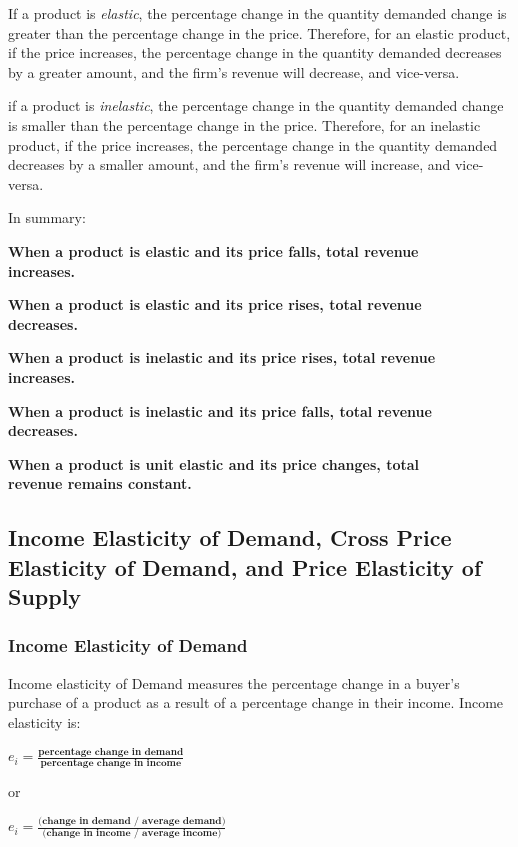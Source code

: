 \documentclass[a4paper, 12pt] {article}
\begin{document}
If a product is \emph{elastic}, the percentage change in the quantity demanded
change is greater than the percentage change in the price. Therefore, for an
elastic product, if the price increases, the percentage change in the quantity
demanded decreases by a greater amount, and the firm's revenue will decrease,
and vice-versa.

if a product is \emph{inelastic}, the percentage change in the quantity demanded
change is smaller than the percentage change in the price. Therefore, for an 
inelastic product, if the price increases, the percentage change in the quantity 
demanded decreases by a smaller amount, and the firm's revenue will increase,
and vice-versa.

In summary:
\begin{description}
    \item \textbf{When a product is elastic and its price falls, total revenue
        \\increases.}
    \item \textbf{When a product is elastic and its price rises, total revenue
        \\decreases.}
    \item \textbf{When a product is inelastic and its price rises, total revenue
        \\increases.}
    \item \textbf{When a product is inelastic and its price falls, total revenue
        \\decreases.}
    \item \textbf{When a product is unit elastic and its price changes, total
        \\revenue remains constant.}
\end{description}

\subsection{Income Elasticity of Demand, Cross Price Elasticity of Demand, and 
Price Elasticity of Supply}
\subsubsection{Income Elasticity of Demand}
Income elasticity of Demand measures the percentage change in a buyer's purchase
of a product as a result of a percentage change in their income. Income elasticity
is:
\begin{description}
    \item $e_i = \frac{\textbf{percentage change in demand}}
                      {\textbf{percentage change in income}}$ 
    \item or
    \item $e_i = \frac{\textbf{(change in demand / average demand)}}
                      {\textbf{(change in income / average income)}}$
\end{description}
\end{document}
